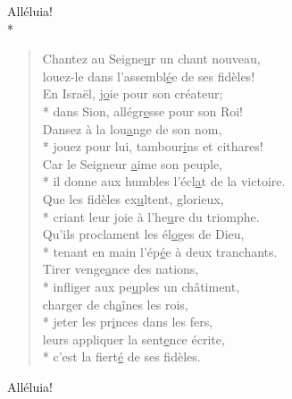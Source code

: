 Alléluia! \\*

\begin{verse}
Chantez au Seigne\underline{u}r un chant nouveau, \\
louez-le dans l’assembl\underline{é}e de ses fidèles! \\
En Israël, j\underline{o}ie pour son créateur; \\*
dans Sion, allégr\underline{e}sse pour son Roi! \\
Dansez à la lou\underline{a}nge de son nom, \\*
jouez pour lui, tambour\underline{i}ns et cithares! \\

Car le Seigneur \underline{a}ime son peuple, \\*
il donne aux humbles l’écl\underline{a}t de la victoire. \\
Que les fidèles ex\underline{u}ltent, glorieux, \\*
criant leur joie à l’he\underline{u}re du triomphe. \\
Qu’ils proclament les él\underline{o}ges de Dieu, \\*
tenant en main l’ép\underline{é}e à deux tranchants. \\

Tirer venge\underline{a}nce des nations, \\*
infliger aux pe\underline{u}ples un châtiment, \\
charger de ch\underline{a}înes les rois, \\*
jeter les pr\underline{i}nces dans les fers, \\
leurs appliquer la sent\underline{e}nce écrite, \\*
c’est la fiert\underline{é} de ses fidèles. \\
\end{verse}

Alléluia! \\

